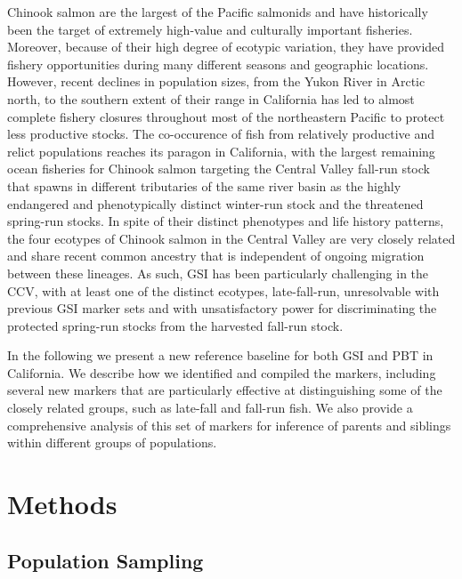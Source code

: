Chinook salmon are the largest of the Pacific salmonids and have historically been the target of extremely high-value and culturally important fisheries. Moreover, because of their high degree of ecotypic variation, they have provided fishery opportunities during many different seasons and geographic locations. However, recent declines in population sizes, from the Yukon River in Arctic north, to the southern extent of their range in California has led to almost complete fishery closures  throughout most of the northeastern Pacific to protect less productive stocks. The co-occurence of fish from relatively productive and relict populations reaches its paragon in California, with the largest remaining ocean fisheries for Chinook salmon targeting the Central Valley fall-run stock that spawns in different tributaries of the same river basin as the highly endangered and phenotypically distinct winter-run stock and the threatened spring-run stocks. In spite of their distinct phenotypes and life history patterns, the four ecotypes of Chinook salmon in the Central Valley are very closely related \cite{clemento2014evaluation} and share recent common ancestry that is independent of ongoing migration between these lineages. As such, GSI has been particularly challenging in the CCV, with at least one of the distinct ecotypes, late-fall-run, unresolvable with previous GSI marker sets \cite{seeb2007development,clemento2014evaluation} and with unsatisfactory power for discriminating the protected spring-run stocks from the harvested fall-run stock.

In the following we present a new reference baseline for both GSI and PBT in California.
We describe how we identified and compiled the markers, including several new markers
that are particularly effective at distinguishing some of the closely related groups,
such as late-fall and fall-run fish.  We also provide a comprehensive analysis of this
set of markers for inference of parents and siblings within different groups of populations.



 \section*{Methods}

\subsection*{Population Sampling}

